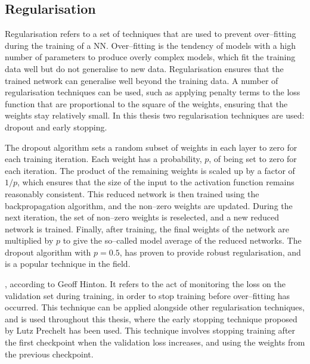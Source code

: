 \subsection{Regularisation}
Regularisation refers to a set of techniques that are used to prevent
over--fitting during the training of a NN. Over--fitting is the tendency
of models with a high number of parameters to produce overly complex models,
which fit the training data well but do not generalise to new data.
Regularisation ensures that the trained network can generalise well beyond the 
training data. A number of regularisation techniques can be used, such as 
applying penalty terms to the loss function that are proportional to the 
square of the weights, ensuring that the weights stay relatively small. In 
this thesis two regularisation techniques are used: 
dropout\cite{Srivastava2014DropoutAS} and early 
stopping\cite{OrrGenevieveB.1998NNTo}.

The dropout algorithm sets a random subset of weights in each layer to zero for
each training iteration. Each weight has a probability, $p$, of being set to 
zero for each iteration. The product of the remaining weights is scaled up by 
a factor of $1/p$, which ensures that the size of the input to the activation 
function remains reasonably consistent. This reduced network is then trained 
using the backpropagation algorithm, and the non--zero weights are updated. 
During the next iteration, the set of non--zero weights is reselected, and a 
new reduced network is trained. Finally, after training, the final weights of 
the network are multiplied by $p$ to give the so--called model average of the 
reduced networks. The dropout algorithm with $p=0.5$, has proven to provide 
robust regularisation, and is a popular technique in the field\cite{Lecun2015}.

, according to Geoff
Hinton\cite{Hinton2015}. It refers to the act of monitoring the loss on the 
validation set during training, in order to stop training before over--fitting 
has occurred. This technique can be applied alongside other regularisation 
techniques, and is used throughout this thesis, where the early stopping 
technique proposed by Lutz Prechelt\cite{OrrGenevieveB.1998NNTo} has been used.
This technique involves stopping training after the first checkpoint when the 
validation loss increases, and using the weights from the previous checkpoint. 
